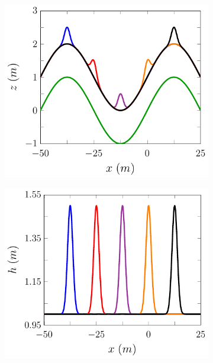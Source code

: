 \begin{figure}
	\centering
	\begin{subfigure}{0.5\textwidth}
		\includegraphics[width=\textwidth]{./chp5/figures/Forced/Wet/FDVMExw.pdf}
		\vspace{0.5cm}
	\end{subfigure}%
	\begin{subfigure}{0.5\textwidth}
		\includegraphics[width=\textwidth]{./chp5/figures/Forced/Wet/FDVMExh.pdf}

\end{subfigure}
\end{figure}
